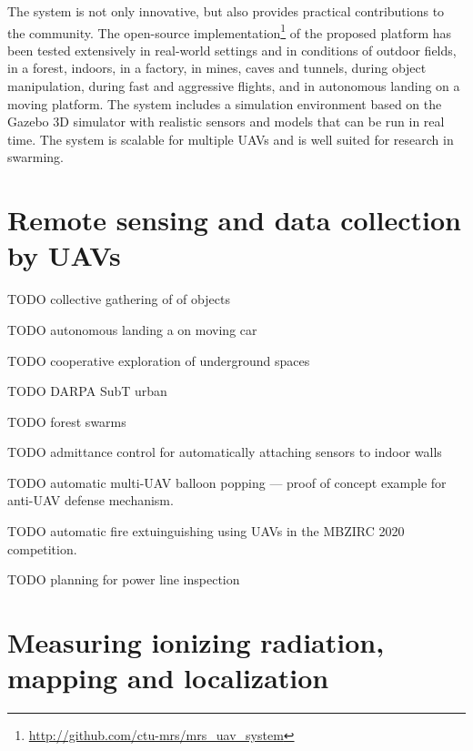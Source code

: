 \documentclass[a4paper,11pt,titlepage,twoside]{book}
\newcommand{\todo}[1]{{\color{red} TODO {#1}}}
\begin{document}
The system is not only innovative, but also provides practical contributions to the community.
The open-source implementation\footnote{\url{http://github.com/ctu-mrs/mrs_uav_system}} of the proposed platform has been tested extensively in real-world settings and in conditions of outdoor fields, in a forest, indoors, in a factory, in mines, caves and tunnels, during object manipulation, during fast and aggressive flights, and in autonomous landing on a moving platform.
The system includes a simulation environment based on the Gazebo 3D simulator with realistic sensors and models that can be run in real time.
The system is scalable for multiple \acp{UAV} and is well suited for research in swarming.



\section{Remote sensing and data collection by UAVs}

\todo{collective gathering of of objects}
\cite{spurny2019cooperative}
\cite{loianno2018localization}

\todo{autonomous landing a on moving car}
\cite{baca2017autonomous}
\cite{baca2019autonomous}

\todo{cooperative exploration of underground spaces}
\cite{roucek2019darpa}


\todo{DARPA SubT urban}
\cite{kratky2020autonomous2} %

\todo{forest swarms}
\cite{dmytruk2020safe}
\cite{ahmad2020autonomous}

\todo{admittance control for automatically attaching sensors to indoor walls}
\cite{smrcka2020admittance}

\todo{automatic multi-UAV balloon popping --- proof of concept example for anti-UAV defense mechanism.}
\cite{stasinchuk2020multiuav}

\todo{automatic fire extuinguishing using UAVs in the MBZIRC 2020 competition.}
\cite{walter2020extinguishing}

\todo{planning for power line inspection}
\cite{silano2020power}




\section{Measuring ionizing radiation, mapping and localization}
\end{document}
